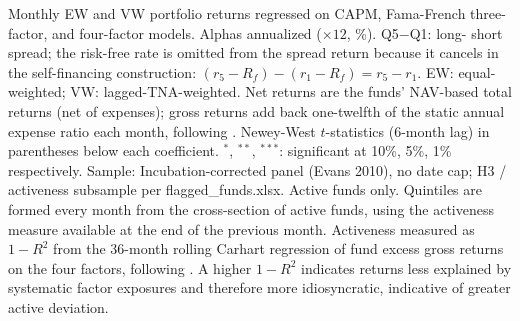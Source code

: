 \begin{table}[!htbp]
\begin{minipage}{\tabletempwidth}
\caption{Alpha and Factor Loadings by Activeness Quintile ($1-R^2$), Gross Returns (\%, Annualized)}\label{tab:activeness_alpha_r2}
\ifdim\wd\tabletempbox>\linewidth
  \resizebox{\linewidth}{!}{\usebox{\tabletempbox}}
\else
  \usebox{\tabletempbox}
\fi
\par\medskip
\begin{singlespace}\tablefont\noindent
Monthly EW and VW portfolio returns regressed on CAPM, Fama-French three-factor, and \textcite{Carhart1997} four-factor models. Alphas annualized ($\times 12$, \%). Q5$-$Q1: long- short spread; the risk-free rate is omitted from the spread return because it cancels in the self-financing construction: $(r_5 - R_f) - (r_1 - R_f) = r_5 - r_1$. EW: equal-weighted; VW: lagged-TNA-weighted. Net returns are the funds' NAV-based total returns (net of expenses); gross returns add back one-twelfth of the static annual expense ratio each month, following \textcite{FamaFrench2010}. Newey-West $t$-statistics (6-month lag) in parentheses below each coefficient. $^{*}$, $^{**}$, $^{***}$: significant at 10\%, 5\%, 1\% respectively. Sample: Incubation-corrected panel (Evans 2010), no date cap; H3 / activeness subsample per flagged\_funds.xlsx. Active funds only. Quintiles are formed every month from the cross-section of active funds, using the activeness measure available at the end of the previous month. Activeness measured as $1-R^2$ from the 36-month rolling Carhart regression of fund excess gross returns on the four factors, following \textcite{AmihudGoyenko2013}. A higher $1-R^2$ indicates returns less explained by systematic factor exposures and therefore more idiosyncratic, indicative of greater active deviation.
\end{singlespace}
\end{minipage}
\end{table}

